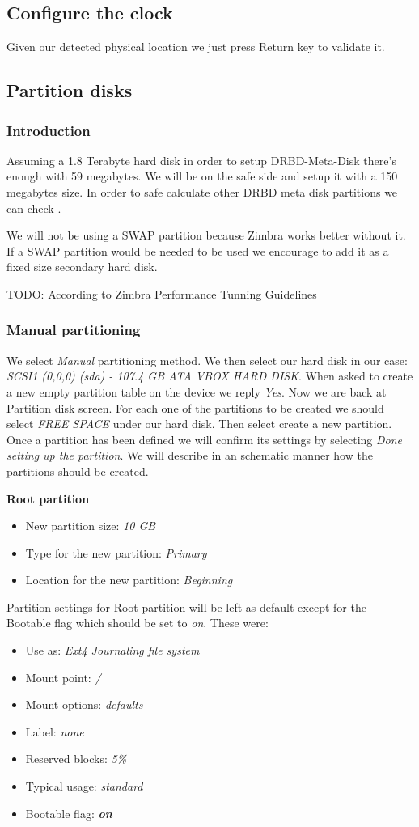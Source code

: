 \subsection {Configure the clock}
Given our detected physical location we just press Return key to validate it.
\subsection {Partition disks}
\subsubsection {Introduction}
Assuming a 1.8 Terabyte hard disk in order to setup DRBD-Meta-Disk there's enough with 59 megabytes. We will be on the safe side and setup it with a 150 megabytes size. In order to safe calculate other DRBD meta disk partitions we can check \cite{LinbitDRBDInternals}.

We will not be using a SWAP partition because Zimbra works better without it. If a SWAP partition would be needed to be used we encourage to add it as a fixed size secondary hard disk.

TODO: According to Zimbra Performance Tunning Guidelines

\subsubsection {Manual partitioning}
We select \textit{Manual} partitioning method. We then select our hard disk in our case: \textit{SCSI1 (0,0,0) (sda) - 107.4 GB ATA VBOX HARD DISK}. When asked to create a new empty partition table on the device we reply \textit{Yes}.
Now we are back at Partition disk screen. For each one of the partitions to be created we should select \textit{FREE SPACE} under our hard disk. Then select create a new partition.  Once a partition has been defined we will confirm its settings by selecting \textit{Done setting up the partition}. We will describe in an schematic manner how the partitions should be created.

\textbf{Root partition}
\begin{itemize}
  \item New partition size: \textit{10 GB}
  \item Type for the new partition: \textit {Primary}
  \item Location for the new partition: \textit{Beginning}
\end{itemize}
Partition settings for Root partition will be left as default except for the Bootable flag which should be set to \textit{on}. These were:
\begin{itemize}
  \item Use as: \textit{Ext4 Journaling file system}
  \item Mount point: \textit{/}
  \item Mount options: \textit{defaults}
  \item Label:	\textit{none}
  \item Reserved blocks: \textit{5\%}
  \item Typical usage: \textit{standard}
  \item Bootable flag: \textbf{\textit{on}}
\end{itemize}


